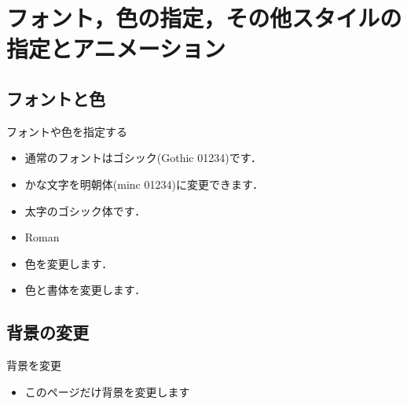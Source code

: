 \section{フォント，色の指定，その他スタイルの指定とアニメーション}

\subsection{フォントと色}

\begin{frame}{フォントや色を指定する}
  \begin{itemize}
    \item 通常のフォントはゴシック(Gothic 01234)です．
    \item {\minc かな文字を明朝体(minc 01234)に変更できます．}
    \item {\bgoth 太字のゴシック体です．}
    \item {\rm Roman }
    \item {\color{blue}色を変更します．}
    \item {\color{blue}\bgoth 色と書体を変更します．}
  \end{itemize}
\end{frame}

\subsection{背景の変更}
{
\begin{frame}{背景を変更}
  \begin{itemize}
    \item このページだけ背景を変更します
  \end{itemize}
\end{frame}
}

